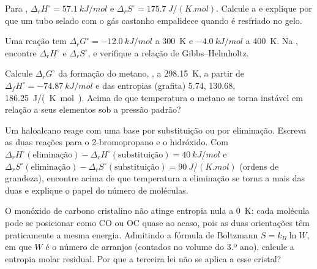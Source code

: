 \begin{exercise}[$\star\star$]\label{exo:b2:reaction-free-energy:6}
Para , $\Delta_r H^\circ = \qty{57.1}{kJ/mol}$ e
$\Delta_r S^\circ = \qty{175.7}{J/(K.mol)}$. Calcule a  e explique por que um tubo selado com o gás castanho 
empalidece quando é resfriado no gelo.
\end{exercise}

\begin{exercise}[$\star\star$]\label{exo:b2:reaction-free-energy:7}
Uma reação tem $\Delta_r G^\circ = \qty{-12.0}{kJ/mol}$ a \qty{300}{K}
e $\qty{-4.0}{kJ/mol}$ a \qty{400}{K}. Na ,
encontre $\Delta_r H^\circ$ e $\Delta_r S^\circ$, e verifique a
relação de Gibbs--Helmholtz.
\end{exercise}

\begin{exercise}[$\star\star$]\label{exo:b2:reaction-free-energy:8}
Calcule $\Delta_r G^\circ$ da formação do metano, , a \qty{298.15}{K}, a partir de $\Delta_f H^\circ = \qty{-74.87}{kJ/mol}$
e das entropias  (grafita) 5.74,  130.68, 
\qty{186.25}{J/(K.mol)}. Acima de que temperatura o metano se torna
instável em relação a seus elementos sob a pressão padrão?
\end{exercise}

\begin{exercise}[$\star\star$]\label{exo:b2:reaction-free-energy:9}
Um haloalcano reage com uma base por substituição ou por eliminação. Escreva
as duas reações para o 2-bromopropano e o hidróxido. Com $\Delta_r
H^\circ(\text{eliminação}) - \Delta_r H^\circ(\text{substituição}) =
\qty{+40}{kJ/mol}$ e $\Delta_r S^\circ(\text{eliminação}) - \Delta_r
S^\circ(\text{substituição}) = \qty{+90}{J/(K.mol)}$ (ordens de grandeza),
encontre acima de que temperatura a eliminação se torna a mais 
das duas e explique o papel do número de moléculas.
\end{exercise}

\begin{exercise}[$\star\star\star$]\label{exo:b2:reaction-free-energy:10}
O monóxido de carbono cristalino não atinge entropia nula a \qty{0}{K}: cada
molécula pode se posicionar como CO ou OC quase ao acaso, pois as duas
orientações têm praticamente a mesma energia. Admitindo a fórmula de
Boltzmann $S = k_B\ln W$, em que
$W$ é o número de arranjos (contados no volume do 3.º ano), calcule
a entropia molar residual. Por que a terceira lei não se aplica a esse
cristal?
\end{exercise}

